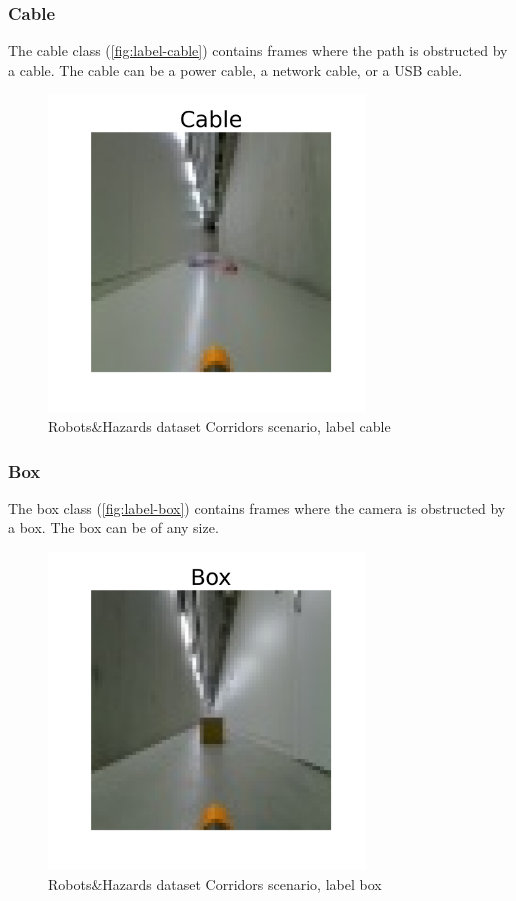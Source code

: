         \subsubsection*{Cable}
            The cable class (\autoref{fig:label-cable}) contains frames where the path is obstructed by a cable. The cable can be a power cable, a network cable, or a USB cable.
            \begin{figure}[H]
                \centering
                \centerline{\includegraphics[width=0.75\textwidth]{img/labels/cable.png}}
                \caption{Robots\&Hazards dataset Corridors scenario, label cable}
                \label{fig:an-cable}
            \end{figure}

        \subsubsection*{Box}
            The box class (\autoref{fig:label-box}) contains frames where the camera is obstructed by a box. The box can be of any size.
            \begin{figure}[H]
                \centering
                \centerline{\includegraphics[width=0.75\textwidth]{img/labels/box.png}}
                \caption{Robots\&Hazards dataset Corridors scenario, label box}
                \label{fig:an-box}
            \end{figure}
    